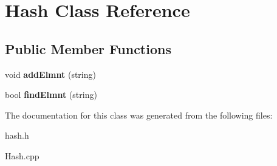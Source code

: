 \hypertarget{class_hash}{}\section{Hash Class Reference}
\label{class_hash}
\subsection*{Public Member Functions}
\begin{DoxyCompactItemize}
\item 
\hypertarget{class_hash_a7b24d4733f90e2de371403b20497a40c}{}\label{class_hash_a7b24d4733f90e2de371403b20497a40c} 
void {\bfseries add\+Elmnt} (string)
\item 
\hypertarget{class_hash_ae9fa61e97638ada66c47f6f3282068ad}{}\label{class_hash_ae9fa61e97638ada66c47f6f3282068ad} 
bool {\bfseries find\+Elmnt} (string)
\end{DoxyCompactItemize}


The documentation for this class was generated from the following files\+:\begin{DoxyCompactItemize}
\item 
hash.\+h\item 
Hash.\+cpp\end{DoxyCompactItemize}
